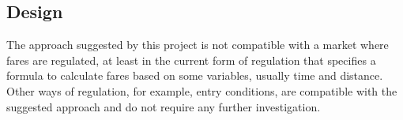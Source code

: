 \subsection{Design}The approach suggested by this project is not compatible with a market where fares are regulated, at least in the current form of regulation that specifies a formula to calculate fares based on some variables, usually time and distance. Other ways of regulation, for example, entry conditions, are compatible with the suggested approach and do not require any further investigation.